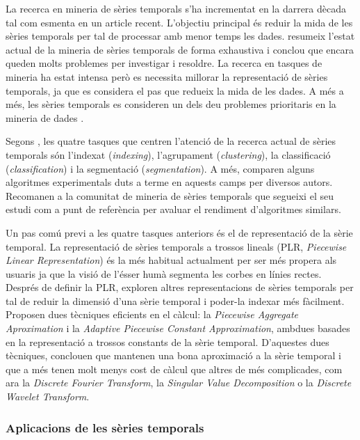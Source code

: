 La recerca en mineria de sèries temporals s'ha incrementat en la darrera dècada tal com esmenta \textcite{fu11} en un article recent. L'objectiu principal és reduir la mida de les sèries temporals per tal de processar amb menor temps les dades.
\citeauthor{fu11} resumeix l'estat actual de la mineria de sèries temporals de forma exhaustiva i conclou que encara queden molts problemes per investigar i resoldre. La recerca en tasques de mineria ha estat intensa però es necessita millorar la representació de sèries temporals, ja que es considera el pas que redueix la mida de les dades. A més a més, les sèries temporals es consideren un dels deu problemes prioritaris  en la mineria de dades \parencite{yangwu06}.

Segons \textcite{keogh02}, les quatre tasques que centren l'atenció de la recerca actual de sèries temporals són l'indexat (\emph{indexing}), l'agrupament (\emph{clustering}), la classificació (\emph{classification}) i la segmentació (\emph{segmentation}). A més, \citeauthor{keogh02} comparen  alguns algoritmes experimentals duts a terme en aquests camps per diversos autors. Recomanen a la comunitat de mineria de sèries temporals que segueixi el seu estudi com a punt de referència per avaluar el rendiment d'algoritmes similars.

Un pas comú previ a les quatre tasques anteriors és el de representació de la sèrie temporal. 
La representació de sèries temporals a trossos lineals (PLR, \emph{Piecewise Linear Representation}) \parencite{keogh97,keogh98} {é}s la més habitual actualment per ser més propera als usuaris ja que la visió de l'ésser humà segmenta les corbes en línies rectes.
Després de definir la PLR, \textcite{keogh00,keogh01} exploren altres representacions de sèries temporals per tal de reduir la dimensió d'una sèrie temporal i poder-la indexar més fàcilment. Proposen dues tècniques eficients en el càlcul: la \emph{Piecewise Aggregate Aproximation} i la \emph{Adaptive Piecewise Constant Approximation}, ambdues basades en la representació a trossos constants de la sèrie temporal. 
D'aquestes dues tècniques, \citeauthor{keogh00,keogh01} conclouen que mantenen una bona aproximació a la sèrie temporal i que a més  tenen molt menys cost de càlcul que altres de més complicades, com ara la \emph{Discrete Fourier Transform},  la  \emph{Singular Value Decomposition} o la \emph{Discrete Wavelet Transform}.




\subsubsection{Aplicacions de les sèries temporals}

